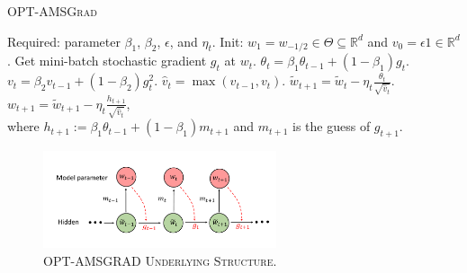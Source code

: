 \documentclass[11pt]{article}
\theoremstyle{k}
\begin{document}
\vspace{-0.15in}
\begin{minipage}{0.54\linewidth}
\begin{algorithm}[H]
\begin{algorithmic}[1] 
\small
\caption{\textsc{OPT-AMSGrad}} \label{alg:optamsgrad}
\STATE Required: parameter $\beta_1$, $\beta_2$, $\epsilon$, and $\eta_t$. 
\STATE Init: $w_1 = w_{-1/2} \in \Theta \subseteq \mathbb R^d $ and $v_{0} = \epsilon 1 \in \mathbb R^{d}$.
\STATE Get mini-batch stochastic gradient $g_t$ at $w_t$.
\STATE $\theta_t = \beta_{1} \theta_{t-1} + (1 - \beta_{1}) g_t$.
\STATE $v_t = \beta_2 v_{t-1} + (1 - \beta_2) g_t^{2}$.
\STATE $\hat{v}_t = \max( \hat{v}_{t-1} , v_t )$. 
\STATE $\tilde{w}_{t+1} =  \tilde{w}_{t} - \eta_t \frac{\theta_t}{ \sqrt{\hat{v}_t }  } $.
\STATE $w_{t+1} = \tilde{w}_{t+1} - \eta_{t} \frac{h_{t+1}}{ \sqrt{\hat{v}_t } } $,  \\  
where $h_{t+1}:= \beta_{1} \theta_{t-1} + (1 - \beta_{1}) m_{t+1}$  and $m_{t+1}$ is the guess of $g_{t+1}$. 
\ENDFOR 
\end{algorithmic}
\end{algorithm}
\end{minipage}
\hfill
\begin{minipage}{0.46\linewidth}
\begin{figure}[H]
\captionsetup{justification=centering}
    \hspace{-0.15in}
    \includegraphics[width=2.7in]{plot.pdf}
    \caption{\textsc{OPT-AMSGRAD Underlying Structure}.}
     \label{fig:scheme}
\end{figure}
\end{minipage}
\end{document}
